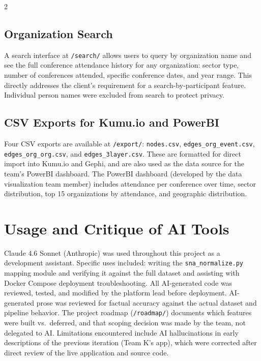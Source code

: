 \documentclass[11pt,letterpaper]{article}
\begin{document}
\begin{multicols}{2}
\subsection{Organization Search}

A search interface at \texttt{/search/} allows users to query by organization
name and see the full conference attendance history for any organization: sector
type, number of conferences attended, specific conference dates, and year range.
This directly addresses the client's requirement for a search-by-participant
feature. Individual person names were excluded from search to protect privacy.

\subsection{CSV Exports for Kumu.io and PowerBI}

Four CSV exports are available at \texttt{/export/}: \texttt{nodes.csv},
\texttt{edges\_org\_event.csv}, \texttt{edges\_org\_org.csv}, and
\texttt{edges\_3layer.csv}. These are formatted for direct import into Kumu.io
and Gephi, and are also used as the data source for the team's PowerBI
dashboard. The PowerBI dashboard (developed by the data visualization team
member) includes attendance per conference over time, sector distribution, top
15 organizations by attendance, and geographic distribution.

\section{Usage and Critique of AI Tools}

Claude 4.6 Sonnet (Anthropic) was used throughout this project as a development
assistant. Specific uses included: writing the \texttt{sna\_normalize.py} mapping
module and verifying it against the full dataset and assisting with Docker Compose deployment
troubleshooting. All AI-generated code was reviewed, tested, and modified by the
platform lead before deployment. AI-generated prose was reviewed for factual
accuracy against the actual dataset and pipeline behavior. The project roadmap
(\texttt{/roadmap/}) documents which features were built vs.\ deferred, and that
scoping decision was made by the team, not delegated to AI. Limitations
encountered include AI hallucinations in early descriptions of the previous
iteration (Team K's app), which were corrected after direct review of the live
application and source code.


\end{multicols}
\end{document}
